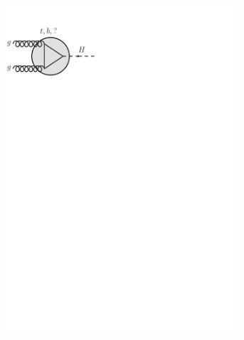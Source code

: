 \begin{figure}[htb!]
  \centering
  \begin{subfigure}{0.32\textwidth}
  \includegraphics[trim=0cm 22cm 12cm 0.5cm, clip=true, width=0.95\textwidth]{Analysis/Figures_ttH/ggH.pdf}
  \caption{}\label{fig:eff_vtx_ggH}\end{subfigure}
  \begin{subfigure}{0.32\textwidth}

\end{subfigure}
\end{figure}
